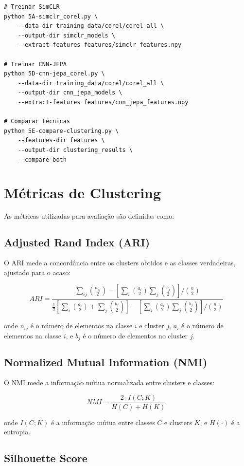\begin{verbatim}
# Treinar SimCLR
python 5A-simclr_corel.py \
    --data-dir training_data/corel/corel_all \
    --output-dir simclr_models \
    --extract-features features/simclr_features.npy

# Treinar CNN-JEPA
python 5D-cnn-jepa_corel.py \
    --data-dir training_data/corel/corel_all \
    --output-dir cnn_jepa_models \
    --extract-features features/cnn_jepa_features.npy

# Comparar técnicas
python 5E-compare-clustering.py \
    --features-dir features \
    --output-dir clustering_results \
    --compare-both
\end{verbatim}

\section{Métricas de Clustering}

As métricas utilizadas para avaliação são definidas como:

\subsection{Adjusted Rand Index (ARI)}

O ARI mede a concordância entre os clusters obtidos e as classes verdadeiras, ajustado para o acaso:

\[
ARI = \frac{\sum_{ij} \binom{n_{ij}}{2} - [\sum_i \binom{a_i}{2} \sum_j \binom{b_j}{2}] / \binom{n}{2}}{\frac{1}{2}[\sum_i \binom{a_i}{2} + \sum_j \binom{b_j}{2}] - [\sum_i \binom{a_i}{2} \sum_j \binom{b_j}{2}] / \binom{n}{2}}
\]

onde $n_{ij}$ é o número de elementos na classe $i$ e cluster $j$, $a_i$ é o número de elementos na classe $i$, e $b_j$ é o número de elementos no cluster $j$.

\subsection{Normalized Mutual Information (NMI)}

O NMI mede a informação mútua normalizada entre clusters e classes:

\[
NMI = \frac{2 \cdot I(C;K)}{H(C) + H(K)}
\]

onde $I(C;K)$ é a informação mútua entre classes $C$ e clusters $K$, e $H(\cdot)$ é a entropia.

\subsection{Silhouette Score}

